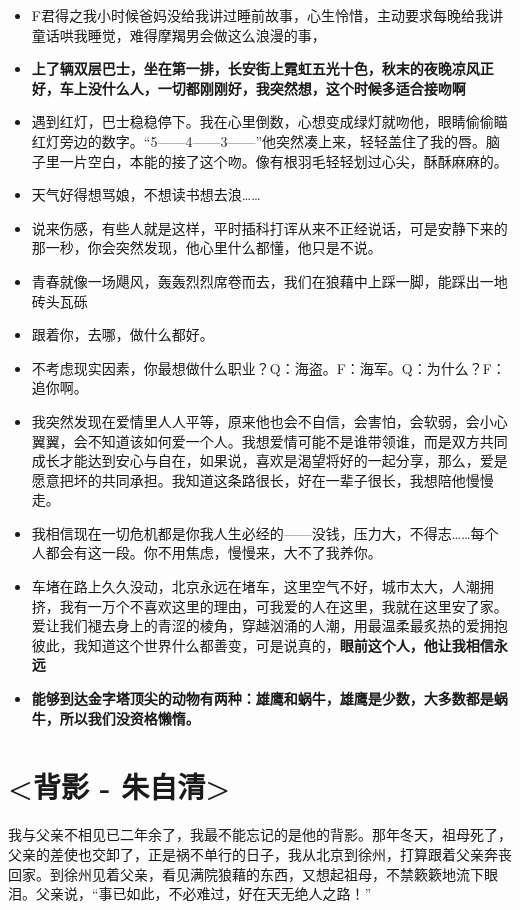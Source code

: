 \documentclass[UTF8,a4paper,8pt]{ctexart}
\begin{document}
\begin{itemize}
 	\item F君得之我小时候爸妈没给我讲过睡前故事，心生怜惜，主动要求每晚给我讲童话哄我睡觉，难得摩羯男会做这么浪漫的事，
 	\item \textbf{上了辆双层巴士，坐在第一排，长安街上霓虹五光十色，秋末的夜晚凉风正好，车上没什么人，一切都刚刚好，我突然想，这个时候多适合接吻啊}
 	\item 遇到红灯，巴士稳稳停下。我在心里倒数，心想变成绿灯就吻他，眼睛偷偷瞄红灯旁边的数字。“5——4——3——”他突然凑上来，轻轻盖住了我的唇。脑子里一片空白，本能的接了这个吻。像有根羽毛轻轻划过心尖，酥酥麻麻的。
 	\item 天气好得想骂娘，不想读书想去浪……
 	\item 说来伤感，有些人就是这样，平时插科打诨从来不正经说话，可是安静下来的那一秒，你会突然发现，他心里什么都懂，他只是不说。
 	\item 青春就像一场飓风，轰轰烈烈席卷而去，我们在狼藉中上踩一脚，能踩出一地砖头瓦砾
 	\item 跟着你，去哪，做什么都好。
 	\item 不考虑现实因素，你最想做什么职业？Q：海盗。F：海军。Q：为什么？F：追你啊。
 	\item 我突然发现在爱情里人人平等，原来他也会不自信，会害怕，会软弱，会小心翼翼，会不知道该如何爱一个人。我想爱情可能不是谁带领谁，而是双方共同成长才能达到安心与自在，如果说，喜欢是渴望将好的一起分享，那么，爱是愿意把坏的共同承担。我知道这条路很长，好在一辈子很长，我想陪他慢慢走。
 	\item 我相信现在一切危机都是你我人生必经的——没钱，压力大，不得志……每个人都会有这一段。你不用焦虑，慢慢来，大不了我养你。
 	\item 车堵在路上久久没动，北京永远在堵车，这里空气不好，城市太大，人潮拥挤，我有一万个不喜欢这里的理由，可我爱的人在这里，我就在这里安了家。爱让我们褪去身上的青涩的棱角，穿越汹涌的人潮，用最温柔最炙热的爱拥抱彼此，我知道这个世界什么都善变，可是说真的，\textbf{眼前这个人，他让我相信永远}
 	\item \textbf{能够到达金字塔顶尖的动物有两种：雄鹰和蜗牛，雄鹰是少数，大多数都是蜗牛，所以我们没资格懒惰。}
 \end{itemize}
 
 
 \newpage
 \section{<背影 - 朱自清>}
 我与父亲不相见已二年余了，我最不能忘记的是他的背影。那年冬天，祖母死了，父亲的差使也交卸了，正是祸不单行的日子，我从北京到徐州，打算跟着父亲奔丧回家。到徐州见着父亲，看见满院狼藉的东西，又想起祖母，不禁簌簌地流下眼泪。父亲说，“事已如此，不必难过，好在天无绝人之路！”
 
\end{document}
